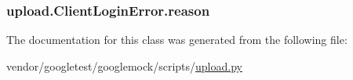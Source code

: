 \subsubsection[{\texorpdfstring{reason}{reason}}]{\setlength{\rightskip}{0pt plus 5cm}upload.\+Client\+Login\+Error.\+reason}\hypertarget{classupload_1_1ClientLoginError_ae0555feb182d89d1e4d7944afbfe14e5}{}\label{classupload_1_1ClientLoginError_ae0555feb182d89d1e4d7944afbfe14e5}


The documentation for this class was generated from the following file\+:\begin{DoxyCompactItemize}
\item 
vendor/googletest/googlemock/scripts/\hyperlink{googlemock_2scripts_2upload_8py}{upload.\+py}\end{DoxyCompactItemize}
